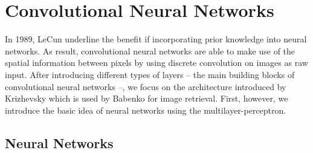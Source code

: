 \section{Convolutional Neural Networks}
\label{sec:convolutional-neural-networks}

In 1989, LeCun \etal \cite{LeCunBoserDenkerhendersonHowardHubbardJackel:1989} underline the benefit if incorporating prior knowledge into neural networks. As result, convolutional neural networks are able to make use of the spatial information between pixels by using discrete convolution on images as raw input. After introducing different types of layers -- the main building blocks of convolutional neural networks --, we focus on the architecture introduced by Krizhevsky \etal \cite{KrizhevskySutskeverHinton:2012} which is used by Babenko \etal \cite{BabenkoSlesarevChigorinLempitsky:2014} for image retrieval. First, however, we introduce the basic idea of neural networks using the multilayer-perceptron.

\subsection{Neural Networks}

